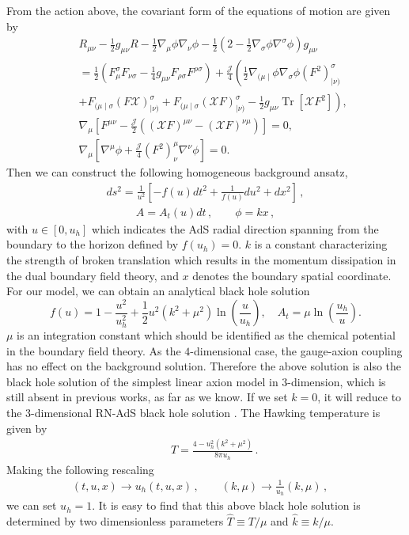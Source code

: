 \documentclass[preprint,onecolumn,nofootinbib]{revtex4}
\newcommand{\fa}{\begin{eqnarray}}
\newcommand{\ffa}{\end{eqnarray}}
\begin{document}
From the action above, the covariant form of the equations of motion are given by
\fa
&&
R_{\mu \nu}-\frac{1}{2} g_{\mu \nu} R-\frac{1}{2} \nabla_{\mu} \phi \nabla_{\nu} \phi-\frac{1}{2}\left(2-\frac{1}{2} \nabla_{\sigma} \phi \nabla^{\sigma} \phi\right) g_{\mu \nu} 
\nonumber
\\
&&
=\frac{1}{2}\left(F_{\mu}^{\sigma} F_{\nu \sigma}-\frac{1}{4} g_{\mu \nu} F_{\rho \sigma} F^{\rho \sigma}\right)+\frac{\mathcal{J}}{4}\left(\frac{1}{2} \nabla_{(\mu \mid} \phi \nabla_{\sigma} \phi\left(F^{2}\right)_{\mid \nu)}^{\sigma}\right. 
\nonumber
\\
&&
\left.+F_{(\mu \mid \sigma}(F \mathcal{X})_{\mid \nu)}^{\sigma}+F_{(\mu \mid \sigma}(\mathcal{X} F)_{\mid \nu)}^{\sigma}-\frac{1}{2} g_{\mu \nu} \operatorname{Tr}\left[\mathcal{X} F^{2}\right]\right),
\
\\
&&
\nabla_{\mu}\left[F^{\mu \nu}-\frac{\mathcal{J}}{2}\left((\mathcal{X} F)^{\mu \nu}-(\mathcal{X} F)^{\nu \mu}\right)\right]=0,
\label{cov-Maxwell}
\\
&&
\nabla_{\mu}\left[\nabla^{\mu} \phi+\frac{\mathcal{J}}{4}\left(F^{2}\right)_{\nu}^{\mu} \nabla^{\nu} \phi\right]=0.
\ffa
Then we can construct the following  homogeneous background ansatz,
\fa
d{s^2} = \frac{1}{{{u^2}}}\left[ - f(u)d{t^2} + \frac{1}{{f(u)}}d{u^2} + d{x^2} \right]\,,
\ffa
\fa
A=A_t(u)dt\,, \qquad \phi=k x\,,
\label{bl-br}
\ffa
with $u\in[0, u_h]$ which indicates the AdS radial direction spanning from the boundary to the horizon defined by $f(u_h)=0$. $k$ is a constant characterizing the strength of broken translation which results in the momentum dissipation in the dual boundary field theory, and $x$ denotes the boundary spatial coordinate. For our model, we can obtain an analytical black hole solution
\begin{equation}
	f(u)=1-\frac{u^{2}}{u_{h}^{2}}+\frac{1}{2} u^{2}\left(k^{2}+\mu^{2}\right) \ln\left(\frac{u}{u_{h}}\right), \quad A_{t}=\mu \ln \left(\frac{u_{h}}{u}\right).
\end{equation}
$\mu$ is an integration constant which should be identified as the chemical potential in the boundary field theory. 
As the $4$-dimensional case, the gauge-axion coupling has no effect on the background solution. Therefore the above solution is also the black hole solution of the simplest linear axion model in $3$-dimension, which is still absent in previous works, as far as we know.
If we set $k = 0$, it will reduce to the $3$-dimensional RN-AdS black hole solution \cite{Ren:2010ha,Liu:2011fy}. The Hawking temperature is given by
\fa
&&
T = \frac{{4 - {u_h^2}\left( {{k^2} + {\mu ^2}} \right)}}{{8\pi {u_h}}}\,.
\ffa
Making the following rescaling
\fa
\label{rescalign}
(t,u,x) \rightarrow u_h (t,u,x)\,,\qquad
(k,\mu)\rightarrow\frac{1}{u_h}(k,\mu)\,,\quad
\ffa
we can set $u_h=1$. It is easy to find that this above black hole solution is determined by two dimensionless parameters $\hat{T}\equiv T/\mu$ and $\hat{k}\equiv k/\mu$.
\end{document}
